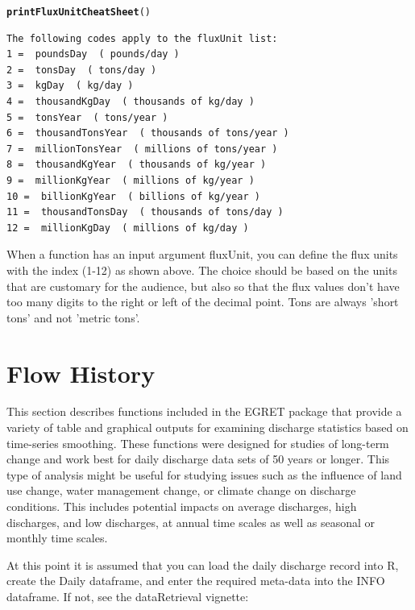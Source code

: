 \documentclass[a4paper,11pt]{article}\usepackage[]{graphicx}\usepackage[]{color}
\makeatletter
\newcommand{\hlstd}[1]{\textcolor[rgb]{0.345,0.345,0.345}{#1}}%
\newcommand{\hlkwd}[1]{\textcolor[rgb]{0.737,0.353,0.396}{\textbf{#1}}}%
\newenvironment{kframe}{%
 \def\at@end@of@kframe{}%
 \ifinner\ifhmode%
  \def\at@end@of@kframe{\end{minipage}}%
  \begin{minipage}{\columnwidth}%
 \fi\fi%
 \def\FrameCommand##1{\hskip\@totalleftmargin \hskip-\fboxsep
 \colorbox{shadecolor}{##1}\hskip-\fboxsep
     \hskip-\linewidth \hskip-\@totalleftmargin \hskip\columnwidth}%
 \MakeFramed {\advance\hsize-\width
   \@totalleftmargin\z@ \linewidth\hsize
   \@setminipage}}%
 {\par\unskip\endMakeFramed%
 \at@end@of@kframe}
\newenvironment{knitrout}{}{} %
\makeatother
\begin{document}
\begin{knitrout}
\color{fgcolor}\begin{kframe}
\begin{alltt}
\hlkwd{printFluxUnitCheatSheet}\hlstd{()}
\end{alltt}
\begin{verbatim}
The following codes apply to the fluxUnit list:
1 =  poundsDay  ( pounds/day )
2 =  tonsDay  ( tons/day )
3 =  kgDay  ( kg/day )
4 =  thousandKgDay  ( thousands of kg/day )
5 =  tonsYear  ( tons/year )
6 =  thousandTonsYear  ( thousands of tons/year )
7 =  millionTonsYear  ( millions of tons/year )
8 =  thousandKgYear  ( thousands of kg/year )
9 =  millionKgYear  ( millions of kg/year )
10 =  billionKgYear  ( billions of kg/year )
11 =  thousandTonsDay  ( thousands of tons/day )
12 =  millionKgDay  ( millions of kg/day )
\end{verbatim}
\end{kframe}
\end{knitrout}


When a function has an input argument fluxUnit, you can define the flux units with the index (1-12) as shown above. The choice should be based on the units that are customary for the audience, but also so that the flux values don't have too many digits to the right or left of the decimal point. Tons are always 'short tons' and not 'metric tons'.

\FloatBarrier

\section{Flow History}
\label{sec:flowHistory}
This section describes functions included in the EGRET package that provide a variety of table and graphical outputs for examining discharge statistics based on time-series smoothing. These functions were designed for studies of long-term change and work best for daily discharge data sets of 50 years or longer. This type of analysis might be useful for studying issues such as the influence of land use change, water management change, or climate change on discharge conditions.  This includes potential impacts on average discharges, high discharges, and low discharges, at annual time scales as well as seasonal or monthly time scales. 

At this point it is assumed that you can load the daily discharge record into R, create the Daily dataframe, and enter the required meta-data into the INFO dataframe. If not, see the dataRetrieval vignette:
\end{document}
